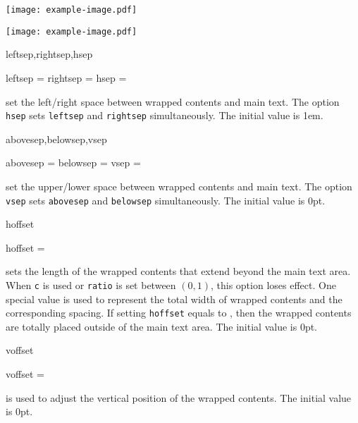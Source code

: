 \documentclass{l3doc}
\newcommand{\opt}[1]{\texttt{#1}}
\begin{document}
\begin{wrapstuff}[c]
  \texttt{[image: example-image.pdf]}
\end{wrapstuff}
\lorem

\begin{wrapstuff}[c,column=false]
  \texttt{[image: example-image.pdf]}
\end{wrapstuff}
\lorem

\begin{function}{leftsep,rightsep,hsep}
  \begin{syntax}
    leftsep = 
    rightsep = 
    hsep = 
  \end{syntax}
  set the left/right space between wrapped contents and main text.
  The option \texttt{hsep} sets \texttt{leftsep} and \texttt{rightsep}
  simultaneously. The initial value is 1em.
\end{function}

\begin{function}{abovesep,belowsep,vsep}
  \begin{syntax}
    abovesep = 
    belowsep = 
    vsep = 
  \end{syntax}
  set the upper/lower space between wrapped contents and main text.
  The option \texttt{vsep} sets \texttt{abovesep} and \texttt{belowsep}
  simultaneously. The initial value is 0pt.
\end{function}

\begin{function}{hoffset}
  \begin{syntax}
    hoffset = 
  \end{syntax}
  sets the length of the wrapped contents that extend beyond
  the main text area. When \texttt{c} is used or \texttt{ratio}
  is set between $(0,1)$, this option loses effect.
  One special value  is used to represent the total width
  of wrapped contents and the corresponding spacing.
  If setting \opt{hoffset} equals to , then
  the wrapped contents are totally placed outside of the main text area.
  The initial value is 0pt.
\end{function}

\begin{function}{voffset}
  \begin{syntax}
    voffset = 
  \end{syntax}
  is used to adjust the vertical position of the wrapped contents.
  The initial value is 0pt.
\end{function}
\end{document}
